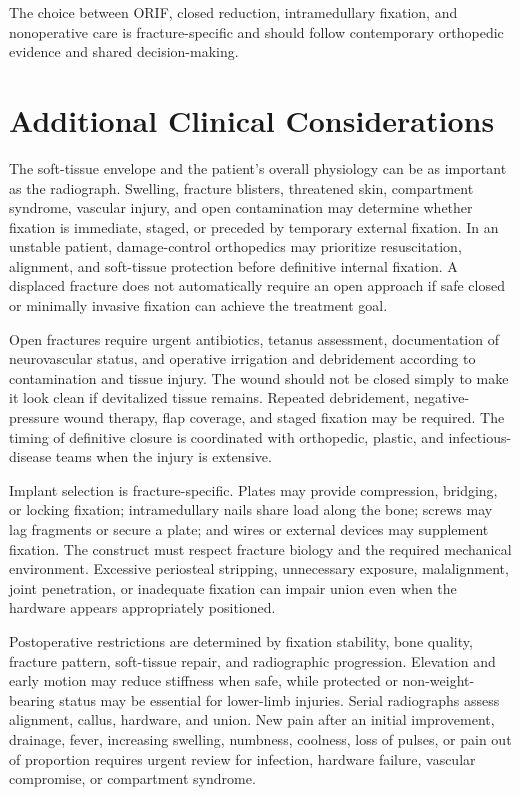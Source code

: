 The choice between ORIF, closed reduction, intramedullary fixation, and nonoperative care is fracture-specific and should follow contemporary orthopedic evidence and shared decision-making.

\section*{Additional Clinical Considerations}
The soft-tissue envelope and the patient's overall physiology can be as important as the radiograph. Swelling, fracture blisters, threatened skin, compartment syndrome, vascular injury, and open contamination may determine whether fixation is immediate, staged, or preceded by temporary external fixation. In an unstable patient, damage-control orthopedics may prioritize resuscitation, alignment, and soft-tissue protection before definitive internal fixation. A displaced fracture does not automatically require an open approach if safe closed or minimally invasive fixation can achieve the treatment goal.

Open fractures require urgent antibiotics, tetanus assessment, documentation of neurovascular status, and operative irrigation and debridement according to contamination and tissue injury. The wound should not be closed simply to make it look clean if devitalized tissue remains. Repeated debridement, negative-pressure wound therapy, flap coverage, and staged fixation may be required. The timing of definitive closure is coordinated with orthopedic, plastic, and infectious-disease teams when the injury is extensive.

Implant selection is fracture-specific. Plates may provide compression, bridging, or locking fixation; intramedullary nails share load along the bone; screws may lag fragments or secure a plate; and wires or external devices may supplement fixation. The construct must respect fracture biology and the required mechanical environment. Excessive periosteal stripping, unnecessary exposure, malalignment, joint penetration, or inadequate fixation can impair union even when the hardware appears appropriately positioned.

Postoperative restrictions are determined by fixation stability, bone quality, fracture pattern, soft-tissue repair, and radiographic progression. Elevation and early motion may reduce stiffness when safe, while protected or non-weight-bearing status may be essential for lower-limb injuries. Serial radiographs assess alignment, callus, hardware, and union. New pain after an initial improvement, drainage, fever, increasing swelling, numbness, coolness, loss of pulses, or pain out of proportion requires urgent review for infection, hardware failure, vascular compromise, or compartment syndrome.

